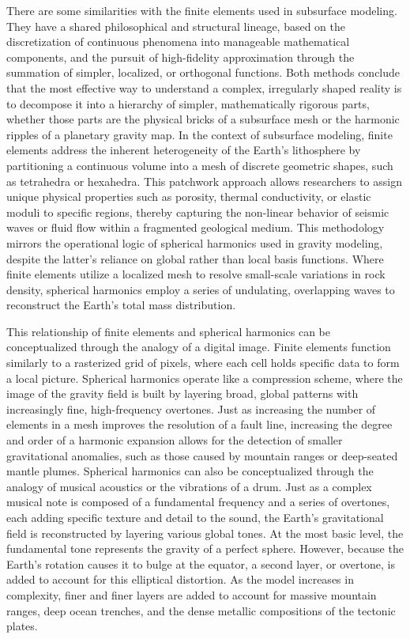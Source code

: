 There are some similarities with the finite elements used in subsurface modeling. They have a shared philosophical and structural lineage, based on the discretization of continuous phenomena into manageable mathematical components, and the pursuit of high-fidelity approximation through the summation of simpler, localized, or orthogonal functions. Both methods conclude that the most effective way to understand a complex, irregularly shaped reality is to decompose it into a hierarchy of simpler, mathematically rigorous parts, whether those parts are the physical bricks of a subsurface mesh or the harmonic ripples of a planetary gravity map. In the context of subsurface modeling, finite elements address the inherent heterogeneity of the Earth’s lithosphere by partitioning a continuous volume into a mesh of discrete geometric shapes, such as tetrahedra or hexahedra. This patchwork approach allows researchers to assign unique physical properties such as porosity, thermal conductivity, or elastic moduli to specific regions, thereby capturing the non-linear behavior of seismic waves or fluid flow within a fragmented geological medium. This methodology mirrors the operational logic of spherical harmonics used in gravity modeling, despite the latter’s reliance on global rather than local basis functions. Where finite elements utilize a localized mesh to resolve small-scale variations in rock density, spherical harmonics employ a series of undulating, overlapping waves to reconstruct the Earth’s total mass distribution. 

This relationship of finite elements and spherical harmonics can be conceptualized through the analogy of a digital image. Finite elements function similarly to a rasterized grid of pixels, where each cell holds specific data to form a local picture. Spherical harmonics operate like a compression scheme, where the image of the gravity field is built by layering broad, global patterns with increasingly fine, high-frequency overtones. Just as increasing the number of elements in a mesh improves the resolution of a fault line, increasing the degree and order of a harmonic expansion allows for the detection of smaller gravitational anomalies, such as those caused by mountain ranges or deep-seated mantle plumes. Spherical harmonics can also be conceptualized through the analogy of musical acoustics or the vibrations of a drum. Just as a complex musical note is composed of a fundamental frequency and a series of overtones, each adding specific texture and detail to the sound, the Earth’s gravitational field is reconstructed by layering various global tones. At the most basic level, the fundamental tone represents the gravity of a perfect sphere. However, because the Earth’s rotation causes it to bulge at the equator, a second layer, or overtone, is added to account for this elliptical distortion. As the model increases in complexity, finer and finer layers are added to account for massive mountain ranges, deep ocean trenches, and the dense metallic compositions of the tectonic plates.

